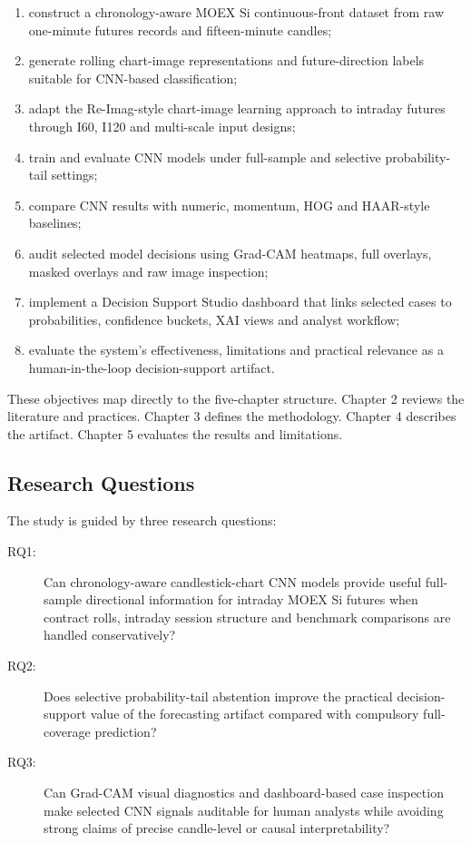 \begin{enumerate}
    \item construct a chronology-aware MOEX Si continuous-front dataset from raw one-minute futures records and fifteen-minute candles;
    \item generate rolling chart-image representations and future-direction labels suitable for CNN-based classification;
    \item adapt the Re-Imag-style chart-image learning approach to intraday futures through I60, I120 and multi-scale input designs;
    \item train and evaluate CNN models under full-sample and selective probability-tail settings;
    \item compare CNN results with numeric, momentum, HOG and HAAR-style baselines;
    \item audit selected model decisions using Grad-CAM heatmaps, full overlays, masked overlays and raw image inspection;
    \item implement a Decision Support Studio dashboard that links selected cases to probabilities, confidence buckets, XAI views and analyst workflow;
    \item evaluate the system's effectiveness, limitations and practical relevance as a human-in-the-loop decision-support artifact.
\end{enumerate}

These objectives map directly to the five-chapter structure. Chapter 2 reviews the literature and practices. Chapter 3 defines the methodology. Chapter 4 describes the artifact. Chapter 5 evaluates the results and limitations.

\subsection{Research Questions}
\label{subsec:research_questions}

The study is guided by three research questions:

\begin{description}
    \item[RQ1:] Can chronology-aware candlestick-chart CNN models provide useful full-sample directional information for intraday MOEX Si futures when contract rolls, intraday session structure and benchmark comparisons are handled conservatively?
    \item[RQ2:] Does selective probability-tail abstention improve the practical decision-support value of the forecasting artifact compared with compulsory full-coverage prediction?
    \item[RQ3:] Can Grad-CAM visual diagnostics and dashboard-based case inspection make selected CNN signals auditable for human analysts while avoiding strong claims of precise candle-level or causal interpretability?
\end{description}

